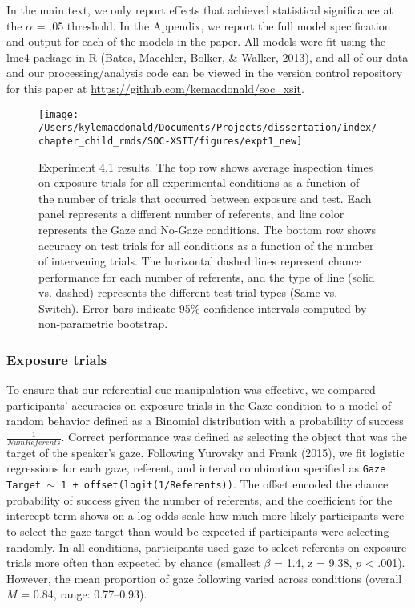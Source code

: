 \documentclass[oneside]{report}
\begin{document}
In the main text, we only report effects that achieved statistical
significance at the \(\alpha\) = .05 threshold. In the Appendix, we
report the full model specification and output for each of the models in
the paper. All models were fit using the lme4 package in R (Bates,
Maechler, Bolker, \& Walker, 2013), and all of our data and our
processing/analysis code can be viewed in the version control repository
for this paper at \url{https://github.com/kemacdonald/soc_xsit}.
\begin{figure}[t]

{\centering \texttt{[image: /Users/kylemacdonald/Documents/Projects/dissertation/index/chapter\_child\_rmds/SOC-XSIT/figures/expt1\_new]} 

}

\caption[Experiment 4.1 results.]{Experiment 4.1 results. The top row shows average inspection times on exposure trials for all experimental conditions as a function of the number of trials that occurred between exposure and test. Each panel represents a different number of referents, and line color represents the Gaze and No-Gaze conditions. The bottom row shows accuracy on test trials for all conditions as a function of the number of intervening trials. The horizontal dashed lines represent chance performance for each number of referents, and the type of line (solid vs. dashed) represents the different test trial types (Same vs. Switch). Error bars indicate 95\% confidence intervals computed by non-parametric bootstrap.}\label{fig:expt1-plot}
\end{figure}
\subsubsection{Exposure trials}\label{exposure-trials}

To ensure that our referential cue manipulation was effective, we
compared participants' accuracies on exposure trials in the Gaze
condition to a model of random behavior defined as a Binomial
distribution with a probability of success \(\frac{1}{Num Referents}\).
Correct performance was defined as selecting the object that was the
target of the speaker's gaze. Following Yurovsky and Frank (2015), we
fit logistic regressions for each gaze, referent, and interval
combination specified as
\texttt{Gaze Target $\sim$ 1 + offset(logit(1/Referents))}. The offset
encoded the chance probability of success given the number of referents,
and the coefficient for the intercept term shows on a log-odds scale how
much more likely participants were to select the gaze target than would
be expected if participants were selecting randomly. In all conditions,
participants used gaze to select referents on exposure trials more often
than expected by chance (smallest \(\beta\) = 1.4, z = 9.38, \(p\)
\textless{} .001). However, the mean proportion of gaze following varied
across conditions (overall \(M\) = 0.84, range: 0.77--0.93).
\end{document}
